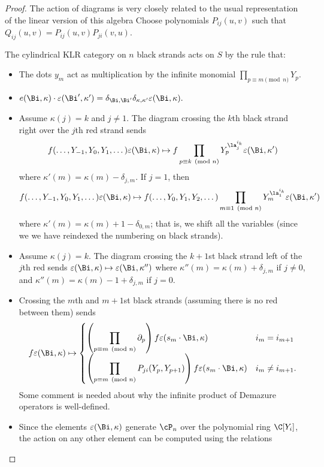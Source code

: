 \begin{proof}
{The action of diagrams is very closely related to the usual representation of the linear version of this algebra
  Choose
polynomials $P_{ij}(u,v)$ such that $Q_{ij}(u,v)=P_{ij}(u,v)P_{ji}(v,u)$.
\begin{lemma}\label{action}
  The cylindrical KLR category on $n$ black strands acts on $S$ by the rule that:
  \begin{itemize}
  \item The dots $y_m$ act as multiplication by the infinite monomial $\displaystyle\prod_{p\equiv m\pmod n}Y_p$.
  \item $e(\Bi,\kappa)\cdot \varepsilon (\Bi',\kappa')=\delta_{\Bi,\Bi'}\delta_{\kappa,\kappa'}\varepsilon(\Bi,\kappa).$
 \item Assume $\kappa(j)=k$ and $j\neq 1$. The diagram crossing the $k$th black
    strand right over the $j$th red strand sends \[f(\dots, Y_{-1},Y_0,Y_{1},\dots) \varepsilon (\Bi,\kappa)\mapsto
    f \displaystyle\prod_{p\equiv k\pmod n} Y_{p}^{\la_j^{i_k}}\varepsilon (\Bi,\kappa')\] where $\kappa'(m)=\kappa(m)-\delta_{j,m}$.  If $j=1$, then \[f(\dots, Y_{-1},Y_0,Y_{1},\dots) \varepsilon (\Bi,\kappa)\mapsto
    f(\dots, Y_{0},Y_1,Y_{2},\dots) \displaystyle\prod_{m\equiv 1\pmod n} Y_{m}^{\la_1^{i_k}}\varepsilon (\Bi,\kappa')\] where $\kappa'(m)=\kappa(m)+1-\delta_{0,m}$; that is, we shift all the variables (since we we have reindexed the numbering on black strands).
\item Assume $\kappa(j)=k$. The diagram crossing the $k+1$st black strand left of the $j$th
  red sends $\varepsilon (\Bi,\kappa)\mapsto \varepsilon (\Bi,\kappa'')$ where $\kappa''(m)=\kappa(m)+\delta_{j,m}$ if $j\neq 0$, and $\kappa''(m)=\kappa(m)-1+\delta_{j,m}$ if $j=0$.
\item Crossing the $m$th and $m+1$st black strands (assuming there is
  no red between them) sends \[f \varepsilon (\Bi,\kappa)\mapsto \begin{cases}\displaystyle \left(\prod_{p\equiv m\pmod n}\partial_p\right)f \varepsilon
  (s_m\cdot \Bi,\kappa)& i_m=i_{m+1}\\\displaystyle
 \left(\prod_{p\equiv m\pmod n} P_{ji}(Y_p,Y_{p+1})\right)f \varepsilon
  (s_m\cdot \Bi,\kappa)&i_m\neq
  i_{m+1}.\end{cases}\]  
  Some comment is needed about why the infinite product of Demazure operators is well-defined. 
\item Since the elements $\varepsilon (\Bi,\kappa)$ generate $\cP_n$
  over the polynomial ring $\C[Y_i]$, the action on any other element
  can be computed using the relations 

\end{itemize}
\end{lemma}}
\end{proof}
